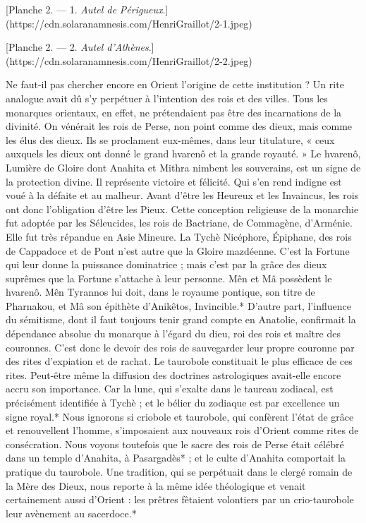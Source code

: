 \documentclass[a4paper, 11pt, oneside, polutonikogreek, french]{article}
\begin{document}
[Planche 2. --- 1. \emph{Autel de Périgueux}.](https://cdn.solaranamnesis.com/HenriGraillot/2-1.jpeg)

[Planche 2. --- 2. \emph{Autel d'Athènes}.](https://cdn.solaranamnesis.com/HenriGraillot/2-2.jpeg)

Ne faut-il pas chercher encore en Orient l'origine de cette institution ? Un rite analogue avait dû s'y perpétuer à l'intention des rois et des villes. Tous les monarques orientaux, en effet, ne prétendaient pas être des incarnations de la divinité. On vénérait les rois de Perse, non point comme des dieux, mais comme les élus des dieux. Ils se proclament eux-mêmes, dans leur titulature, « ceux auxquels les dieux ont donné le grand hvarenô et la grande royauté. » Le hvarenô, Lumière de Gloire dont Anahita et Mithra nimbent les souverains, est un signe de la protection divine. Il représente victoire et félicité. Qui s'en rend indigne est voué à la défaite et au malheur. Avant d'être les Heureux et les Invaincus, les rois ont donc l'obligation d'être les Pieux. Cette conception religieuse de la monarchie fut adoptée par les Séleucides, les rois de Bactriane, de Commagène, d'Arménie. Elle fut très répandue en Asie Mineure. La Tychè Nicéphore, Épiphane, des rois de Cappadoce et de Pont n'est autre que la Gloire mazdéenne. C'est la Fortune qui leur donne la puissance dominatrice ; mais c'est par la grâce des dieux suprêmes que la Fortune s'attache à leur personne. Mên et Mâ possèdent le hvarenô. Mên Tyrannos lui doit, dans le royaume pontique, son titre de Pharnakou, et Mâ son épithète d'Anikêtos, Invincible.* D'autre part, l'influence du sémitisme, dont il faut toujours tenir grand compte en Anatolie, confirmait la dépendance absolue du monarque à l'égard du dieu, roi des rois et maître des couronnes. C'est donc le devoir des rois de sauvegarder leur propre couronne par des rites d'expiation et de rachat. Le taurobole constituait le plus efficace de ces rites. Peut-être même la diffusion des doctrines astrologiques avait-elle encore accru son importance. Car la lune, qui s'exalte dans le taureau zodiacal, est précisément identifiée à Tychè ; et le bélier du zodiaque est par excellence un signe royal.* Nous ignorons si criobole et taurobole, qui confèrent l'état de grâce et renouvellent l'homme, s'imposaient aux nouveaux rois d'Orient comme rites de consécration. Nous voyons toutefois que le sacre des rois de Perse était célébré dans un temple d'Anahita, à Pasargadès* ; et le culte d'Anahita comportait la pratique du taurobole. Une tradition, qui se perpétuait dans le clergé romain de la Mère des Dieux, nous reporte à la même idée théologique et venait certainement aussi d'Orient : les prêtres fêtaient volontiers par un crio-taurobole leur avènement au sacerdoce.*
\end{document}
